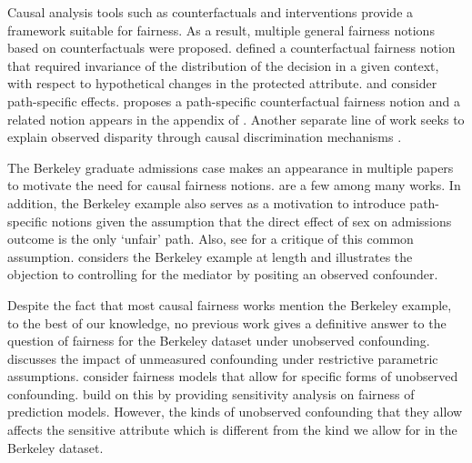 Causal analysis tools such as counterfactuals and interventions provide a framework suitable for fairness. As a result, multiple general fairness notions based on counterfactuals were proposed.  \citet{KusnerLRS17} defined a counterfactual fairness notion that required invariance of the distribution of the decision in a given context, with respect to hypothetical changes in the protected attribute. \citet{NabiShpitser18} and \citet{ZhangWW17} consider path-specific effects. \citet{Chiappa19} proposes a path-specific counterfactual fairness notion and a related notion appears in the appendix of \citet{KusnerLRS17}. Another separate line of work seeks to explain observed disparity through causal discrimination mechanisms \citep{ZhangBareinboim18, plecko2022causal}.

The Berkeley graduate admissions case makes an appearance in multiple papers to motivate the need for causal fairness notions. \cite{KilbertusRPHJS17, plecko2022causal,KusnerLRS17,Chiappa19,BerkKT23} are a few among many works. In addition, the Berkeley example also serves as a motivation to introduce path-specific notions given the assumption that the direct effect of sex on admissions outcome is the only `unfair' path. Also, see \citet{BarocasHN23} for a critique of this common assumption. \citet{Pearl09} considers the Berkeley example at length and illustrates the objection to controlling for the mediator by positing an observed confounder. 

Despite the fact that most causal fairness works mention the Berkeley example, to the best of our knowledge, no previous work gives a definitive answer to the question of fairness for the Berkeley dataset under unobserved confounding. \citet{KilbertusBKWS20} discusses the impact of unmeasured confounding under restrictive parametric assumptions. \citet{ZhangBareinboim18, plecko2022causal} consider fairness models that allow for specific forms of unobserved confounding. \citet{SchroderFF24} build on this by providing sensitivity analysis on fairness of prediction models. However, the kinds of unobserved confounding that they allow affects the sensitive attribute which is different from the kind we allow for in the Berkeley dataset. 




